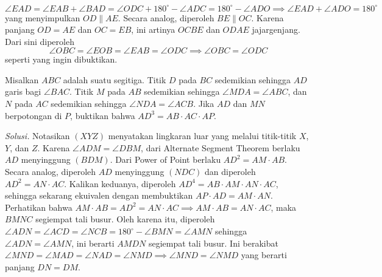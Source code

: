 \documentclass[a4paper, 11pt]{article}
\begin{document}
\[\angle EAD = \angle EAB+\angle BAD = \angle ODC + 180^\circ - \angle ADC = 180^\circ - \angle ADO\implies \angle EAD+\angle ADO = 180^\circ\]
yang menyimpulkan $OD\parallel AE$. Secara analog, diperoleh $BE\parallel OC$. Karena panjang $OD=AE$ dan $OC=EB$, ini artinya $OCBE$ dan $ODAE$ jajargenjang. Dari sini diperoleh
\[\angle OBC = \angle EOB = \angle EAB = \angle ODC\implies \angle OBC=\angle ODC\]
seperti yang ingin dibuktikan.
\begin{center}
\end{center}
\newpage
\begin{tcolorbox}[title=\textbf{Soal 5: OSN 2014/6}]
Misalkan $ABC$ adalah suatu segitiga. Titik $D$ pada $BC$ sedemikian sehingga $AD$ garis bagi $\angle BAC$. Titik $M$ pada $AB$ sedemikian sehingga $\angle MDA=\angle ABC$, dan $N$ pada $AC$ sedemikian sehingga $\angle NDA=\angle ACB$. Jika $AD$ dan $MN$ berpotongan di $P$, buktikan bahwa $AD^3=AB\cdot AC\cdot AP$.
\end{tcolorbox}
\noindent\textit{Solusi.} Notasikan $(XYZ)$ menyatakan lingkaran luar yang melalui titik-titik $X$, $Y$, dan $Z$. Karena $\angle ADM=\angle DBM$, dari Alternate Segment Theorem berlaku $AD$ menyinggung $(BDM)$. Dari Power of Point berlaku $AD^2=AM\cdot AB$. Secara analog, diperoleh $AD$ menyinggung $(NDC)$ dan diperoleh $AD^2=AN\cdot AC$. Kalikan keduanya, diperoleh $AD^4 = AB\cdot AM\cdot AN\cdot AC$, sehingga sekarang ekuivalen dengan membuktikan $AP\cdot AD=AM\cdot AN$.\\
Perhatikan bahwa $AM\cdot AB=AD^2 = AN\cdot AC\implies AM\cdot AB=AN\cdot AC$, maka $BMNC$ segiempat tali busur. Oleh karena itu, diperoleh $\angle ADN=\angle ACD=\angle NCB = 180^\circ - \angle BMN = \angle AMN$ sehingga $\angle ADN=\angle AMN$, ini berarti $AMDN$ segiempat tali busur. Ini berakibat $\angle MND=\angle MAD=\angle NAD=\angle NMD\implies \angle MND=\angle NMD$ yang berarti panjang $DN=DM$.\\
\end{document}
